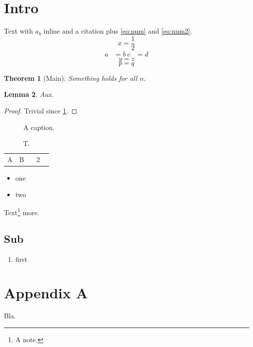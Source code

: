 \documentclass{article}
\newtheorem{theorem}{Theorem}[section]
\newtheorem{lemma}[theorem]{Lemma}
\begin{document}
\maketitle
\begin{abstract}
Abstract text with $x+y$.
\end{abstract}
\section{Intro}
Text with \(a_b\) inline and a citation \cite{Ref1} plus \ref{eq:num} and \eqref{eq:num2}.
\begin{equation}\label{eq:num}
  x = \frac{1}{2}
\end{equation}
\begin{align}\label{eq:num2}
  a &= b \
  c &= d
\end{align}
\[
  y = z \tag{star}
\]
\begin{equation*}
  p = q
\end{equation*}
\begin{theorem}[Main]\label{thm:m}
  Something holds for all $n$.
\end{theorem}
\begin{lemma}\label{lem:l}
  Aux.
\end{lemma}
\begin{proof}
  Trivial since \ref{thm:m}.
\end{proof}
\begin{figure}
  \centering
  \caption{A caption. \label{fig:f}}
\end{figure}
\begin{table}
  \caption{T. \label{tab:t}}
  \begin{tabular}{lcr}
    \hline
    A & B \ \hline
    1 & 2 \
    \hline
  \end{tabular}
\end{table}
\begin{itemize}
  \item one
  \item two
\end{itemize}
Text\footnote{A note.} more.

\subsection{Sub}
\begin{enumerate}
 \item first
\end{enumerate}

\appendix
\section{Appendix A}
Bla.
\end{document}
